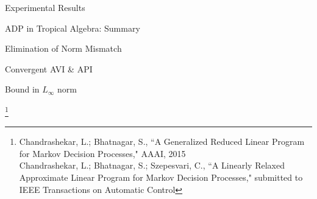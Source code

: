 \documentclass[10pt]{beamer}
\begin{document}
\begin{frame}{Experimental Results}
\end{frame}

\begin{frame}[fragile]{ADP in Tropical Algebra: Summary}
\begin{block}{\Large Elimination of Norm Mismatch}\end{block}
\vspace{10pt}

\begin{block}{\Large Convergent AVI \& API}\end{block}
\vspace{10pt}

\begin{block}{\Large Bound in $L_\infty$ norm}\end{block}

\end{frame}

\begin{frame}[fragile]{}

\begin{block}{}
\centering  { \Large \color{teal}{Approximate Linear Programming for Large Scale MDPs: Geometric insights}}\footnote{Chandrashekar, L.; Bhatnagar, S., ``A Generalized Reduced Linear Program for Markov Decision Processes," AAAI, 2015\\
Chandrashekar, L.; Bhatnagar, S.; Szepesvari, C., ``A Linearly Relaxed Approximate Linear Program for Markov Decision Processes," submitted to IEEE Transactions on Automatic Control
}
\end{block}



\end{frame}
\end{document}
